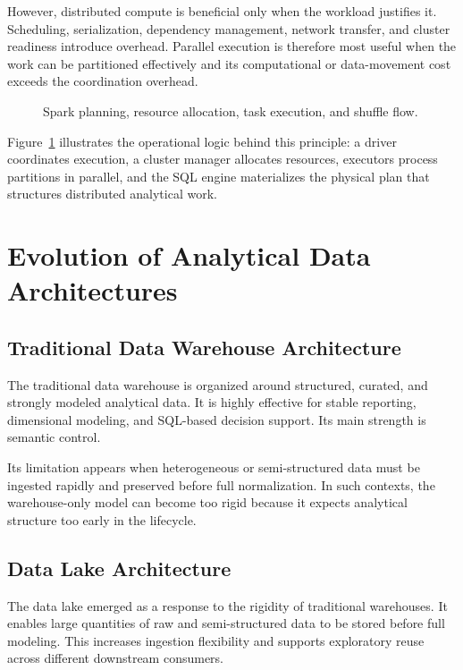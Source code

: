 However, distributed compute is beneficial only when the workload justifies it. Scheduling, serialization, dependency management, network transfer, and cluster readiness introduce overhead. Parallel execution is therefore most useful when the work can be partitioned effectively and its computational or data-movement cost exceeds the coordination overhead.

\begin{figure}[H]
    \centering
    
    \caption{Spark planning, resource allocation, task execution, and shuffle flow.}
    \label{fig:spark-execution-model}
\end{figure}

Figure~\ref{fig:spark-execution-model} illustrates the operational logic behind this principle: a driver coordinates execution, a cluster manager allocates resources, executors process partitions in parallel, and the SQL engine materializes the physical plan that structures distributed analytical work.

\section{Evolution of Analytical Data Architectures}

\subsection{Traditional Data Warehouse Architecture}
The traditional data warehouse is organized around structured, curated, and strongly modeled analytical data. It is highly effective for stable reporting, dimensional modeling, and SQL-based decision support. Its main strength is semantic control.

Its limitation appears when heterogeneous or semi-structured data must be ingested rapidly and preserved before full normalization. In such contexts, the warehouse-only model can become too rigid because it expects analytical structure too early in the lifecycle.

\subsection{Data Lake Architecture}
The data lake emerged as a response to the rigidity of traditional warehouses. It enables large quantities of raw and semi-structured data to be stored before full modeling. This increases ingestion flexibility and supports exploratory reuse across different downstream consumers.

